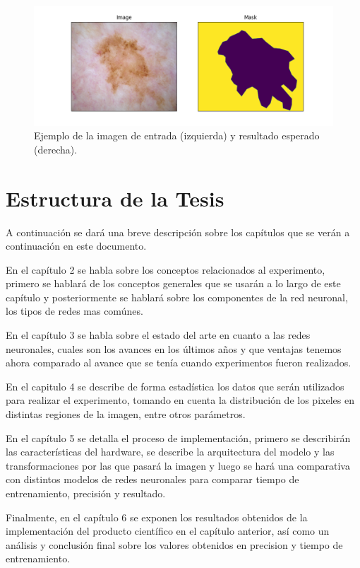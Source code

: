 \begin{figure}
    \includegraphics[width=150mm]{Figuras/plot_masks.png}
    \centering
    \caption{Ejemplo de la imagen de entrada (izquierda) y resultado esperado (derecha).}
\end{figure}

\section{Estructura de la Tesis}

A continuación se dará una breve descripción sobre los capítulos que se verán a continuación en este documento.

En el capítulo 2 se habla sobre los conceptos relacionados al experimento, primero se hablará de los conceptos generales que se usarán a lo largo de este capítulo y posteriormente se hablará sobre los componentes de la red neuronal, los tipos de redes mas comúnes. 

En el capítulo 3 se habla sobre el estado del arte en cuanto a las redes neuronales, cuales son los avances en los últimos años y que ventajas tenemos ahora comparado al avance que se tenía cuando experimentos fueron realizados.

En el capitulo 4 se describe de forma estadística los datos que serán utilizados para realizar el experimento, tomando en cuenta la distribución de los pixeles en distintas regiones de la imagen, entre otros parámetros. 

En el capítulo 5 se detalla el proceso de implementación, primero se describirán las características del hardware, se describe la arquitectura del modelo y las transformaciones por las que pasará la imagen y luego se hará una comparativa con distintos modelos de redes neuronales para comparar tiempo de entrenamiento, precisión y resultado.

Finalmente, en el capítulo 6 se exponen los resultados obtenidos de la implementación del producto científico en el capítulo anterior, así como un análisis y conclusión final sobre los valores obtenidos en precision y tiempo de entrenamiento. 


